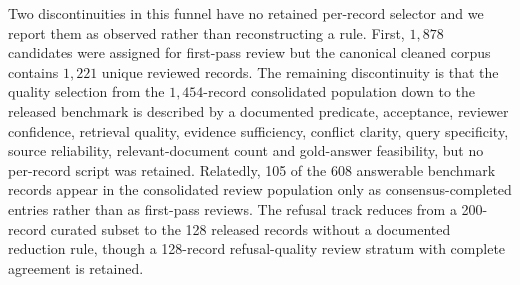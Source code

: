 \begin{table}[htbp]
\caption{Non-refusal construction funnel, counts as observed in the retained
artifacts.}
\label{tab:funnel}
\end{table}

Two discontinuities in this funnel have no retained per-record selector and we
report them as observed rather than reconstructing a rule. First, $1{,}878$
candidates were assigned for first-pass review but the canonical cleaned corpus
contains $1{,}221$ unique reviewed records. The remaining discontinuity is that the quality selection from
the $1{,}454$-record consolidated population down to the released benchmark is
described by a documented predicate, acceptance, reviewer confidence, retrieval
quality, evidence sufficiency, conflict clarity, query specificity, source
reliability, relevant-document count and gold-answer feasibility, but no
per-record script was retained. Relatedly, 105 of the 608 answerable benchmark
records appear in the consolidated review population only as consensus-completed
entries rather than as first-pass reviews. The refusal track reduces from a
200-record curated subset to the 128 released records without a documented
reduction rule, though a 128-record refusal-quality review stratum with complete
agreement is retained.

